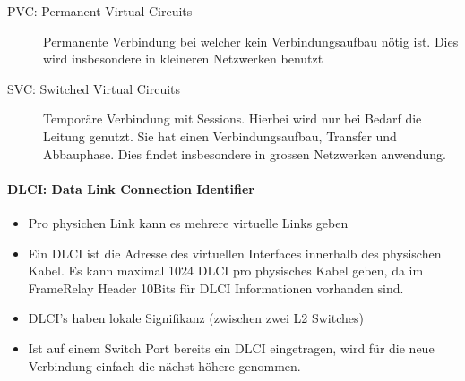 \begin{description}
	\item[PVC: Permanent Virtual Circuits] Permanente Verbindung bei welcher kein Verbindungsaufbau nötig ist. Dies wird insbesondere in kleineren Netzwerken benutzt
	\item[SVC: Switched Virtual Circuits] Temporäre Verbindung mit Sessions. Hierbei wird nur bei Bedarf die Leitung genutzt. Sie hat einen Verbindungsaufbau, Transfer und Abbauphase. Dies findet insbesondere in grossen Netzwerken anwendung.
\end{description}

\paragraph{DLCI: Data Link Connection Identifier}
\begin{itemize}
	\item Pro physichen Link kann es mehrere virtuelle Links geben
	\item Ein DLCI ist die Adresse des virtuellen Interfaces innerhalb des physischen Kabel. Es kann maximal 1024 DLCI pro physisches Kabel geben, da im FrameRelay Header 10Bits für DLCI Informationen vorhanden sind.
	\item DLCI's haben lokale Signifikanz (zwischen zwei L2 Switches)
	\item Ist auf einem Switch Port bereits ein DLCI eingetragen, wird für die neue Verbindung einfach die nächst höhere genommen.
\end{itemize}

